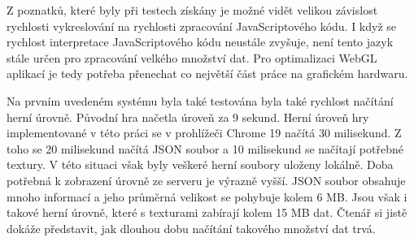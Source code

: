 Z poznatků, které byly při testech získány je možné vidět velikou závislost rychlosti vykreslování na rychlosti zpracování JavaScriptového kódu. I když se rychlost interpretace JavaScriptového kódu neustále zvyšuje, není tento jazyk stále určen pro zpracování velkého množství dat. Pro optimalizaci WebGL aplikací je tedy potřeba přenechat co největší část práce na grafickém hardwaru. 

Na prvním uvedeném systému byla také testována byla také rychlost načítání herní úrovně. Původní hra načetla úroveň za 9 sekund. Herní úroveň hry implementované v této práci se v prohlížeči Chrome 19 načítá 30 milisekund. Z toho se 20 milisekund načítá JSON soubor a 10 milisekund se načítají potřebné textury. V této situaci však byly veškeré herní soubory uloženy lokálně. Doba potřebná k zobrazení úrovně ze serveru je výrazně vyšší. JSON soubor obsahuje mnoho informací a jeho průměrná velikost se pohybuje kolem 6 MB. Jsou však i takové herní úrovně, které s texturami zabírají kolem 15 MB dat. Čtenář si jistě dokáže představit, jak dlouhou dobu načítání takového množství dat trvá.